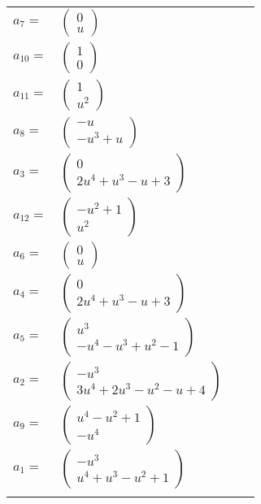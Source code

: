 \documentclass[1p]{elsarticle_modified}
\theoremstyle{definition}
\begin{document}
\begin{tabular}{m{7pt} m{180pt} m{7pt} m{180pt} }
\flushright $a_{7}=$&$\begin{pmatrix}0\\u\end{pmatrix}$ \\
\flushright $a_{10}=$&$\begin{pmatrix}1\\0\end{pmatrix}$ \\
\flushright $a_{11}=$&$\begin{pmatrix}1\\u^2\end{pmatrix}$ \\
\flushright $a_{8}=$&$\begin{pmatrix}- u\\- u^3+u\end{pmatrix}$ \\
\flushright $a_{3}=$&$\begin{pmatrix}0\\2 u^4+u^3- u+3\end{pmatrix}$ \\
\flushright $a_{12}=$&$\begin{pmatrix}- u^2+1\\u^2\end{pmatrix}$ \\
\flushright $a_{6}=$&$\begin{pmatrix}0\\u\end{pmatrix}$ \\
\flushright $a_{4}=$&$\begin{pmatrix}0\\2 u^4+u^3- u+3\end{pmatrix}$ \\
\flushright $a_{5}=$&$\begin{pmatrix}u^3\\- u^4- u^3+u^2-1\end{pmatrix}$ \\
\flushright $a_{2}=$&$\begin{pmatrix}- u^3\\3 u^4+2 u^3- u^2- u+4\end{pmatrix}$ \\
\flushright $a_{9}=$&$\begin{pmatrix}u^4- u^2+1\\- u^4\end{pmatrix}$ \\
\flushright $a_{1}=$&$\begin{pmatrix}- u^3\\u^4+u^3- u^2+1\end{pmatrix}$\\&\end{tabular}
\end{document}
